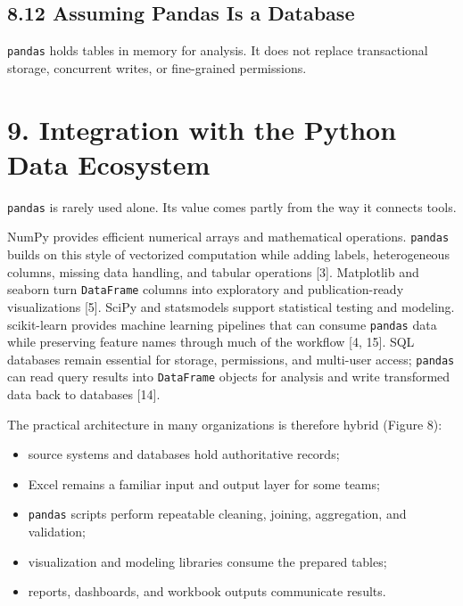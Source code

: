 \documentclass[
  12pt,
]{article}
\providecommand{\tightlist}{%
  \setlength{\itemsep}{0pt}\setlength{\parskip}{0pt}}
\begin{document}
\subsection{8.12 Assuming Pandas Is a
Database}\label{assuming-pandas-is-a-database}

\texttt{pandas} holds tables in memory for analysis. It does not replace
transactional storage, concurrent writes, or fine-grained permissions.

\section{9. Integration with the Python Data
Ecosystem}\label{integration-with-the-python-data-ecosystem}

\texttt{pandas} is rarely used alone. Its value comes partly from the
way it connects tools.

NumPy provides efficient numerical arrays and mathematical operations.
\texttt{pandas} builds on this style of vectorized computation while
adding labels, heterogeneous columns, missing data handling, and tabular
operations {[}3{]}. Matplotlib and seaborn turn \texttt{DataFrame}
columns into exploratory and publication-ready visualizations {[}5{]}.
SciPy and statsmodels support statistical testing and modeling.
scikit-learn provides machine learning pipelines that can consume
\texttt{pandas} data while preserving feature names through much of the
workflow {[}4, 15{]}. SQL databases remain essential for storage,
permissions, and multi-user access; \texttt{pandas} can read query
results into \texttt{DataFrame} objects for analysis and write
transformed data back to databases {[}14{]}.

The practical architecture in many organizations is therefore hybrid
(Figure 8):

\begin{itemize}
\tightlist
\item
  source systems and databases hold authoritative records;
\item
  Excel remains a familiar input and output layer for some teams;
\item
  \texttt{pandas} scripts perform repeatable cleaning, joining,
  aggregation, and validation;
\item
  visualization and modeling libraries consume the prepared tables;
\item
  reports, dashboards, and workbook outputs communicate results.
\end{itemize}
\end{document}
